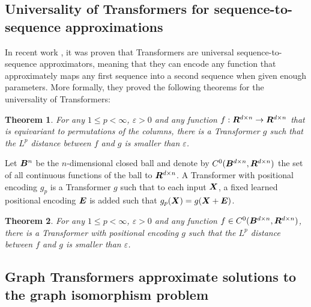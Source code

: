 \documentclass{article}
\newtheorem{theorem}{Theorem}
\begin{document}
\subsection{Universality of Transformers for sequence-to-sequence approximations}
\label{app:universality-transformers-sequences}

In recent work \cite{yun2020transformers} \cite{yun2020sparsetransformers}, it was proven that Transformers are universal sequence-to-sequence approximators, meaning that they can encode any function that approximately maps any first sequence into a second sequence when given enough parameters. More formally, they proved the following theorems for the universality of Transformers:

\begin{theorem}\label{thm:equivariant universality}
For any $1\leq p < \infty$, $\varepsilon>0$ and any function $f:{\bm{R}}^{d\times n} \to {\bm{R}}^{d\times n} $ that is equivariant to permutations of the columns, there is a Transformer $g$ such that the $L^p$ distance between $f$ and $g$ is smaller than $\varepsilon$. 
\end{theorem}


Let ${\bm{B}}^n$ be the $n$-dimensional closed ball and denote by $C^0({\bm{B}}^{d\times n}, {\bm{R}}^{d\times n})$ the set of all continuous functions of the ball to ${\bm{R}}^{d\times n}$. A Transformer with positional encoding $g_p$ is a Transformer $g$ such that to each input ${\bm{X}}$, a fixed learned positional encoding ${\bm{E}}$ is added such that $g_p({\bm{X}}) = g({\bm{X}} + {\bm{E}})$.


\begin{theorem}\label{thm:universality}
For any $1\leq p < \infty$, $\varepsilon>0$ and any function $f\in C^0({\bm{B}}^{d\times n}, {\bm{R}}^{d\times n}) $, there is a Transformer with positional encoding $g$ such that the $L^p$ distance between $f$ and $g$ is smaller than $\varepsilon$.
\end{theorem}


\subsection{Graph Transformers approximate solutions to the graph isomorphism problem}
\label{app:universality-transformers-graphs}
\end{document}
